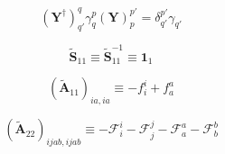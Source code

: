 \begin{subappendices}
\begin{equation}
    (\mathbf{Y}^\dagger)_{q'}^q
    \gamma_q^p
    (\mathbf{Y})_p^{p'}
    =
    \delta_{q'}^{p'}
    \gamma_{q'}
\end{equation}

\begin{equation}
    \tilde{\mathbf{S}}_{11}
    \equiv
    \tilde{\mathbf{S}}_{11}^{-1}
    \equiv
    \mathbf{1}_1
\end{equation}

\begin{equation}
    (\tilde{\mathbf{A}}_{11})_{ia,ia}
    \equiv
    -
    f_i^i
    +
    f_a^a
\end{equation}

\begin{equation}
    (\tilde{\mathbf{A}}_{22})_{ijab,ijab}
    \equiv
    -
    \mathcal{F}_i^i
    -
    \mathcal{F}_j^j
    -
    \mathcal{F}_a^a
    -
    \mathcal{F}_b^b
\end{equation}

\end{subappendices}

